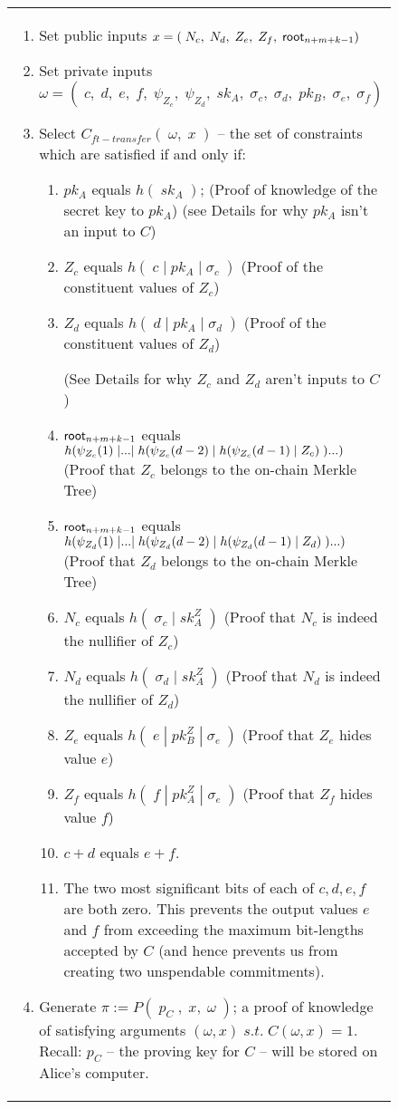 \begin{figure}[htp]
\begin{center}
\begin{framed}
{\begin{tabular}{p{16cm}}
\begin{enumerate}
          \item Set public inputs $x = (\;N_c,\;N_d,\;Z_e,\;Z_f,\;\mathsf{root}_{n+m+k-1})$
          \item Set private inputs $\omega = (\;c,\;d,\;e,\;f,\;\psi_{Z_c},\;\psi_{Z_d},\;sk_A,\;\sigma_c,\;\sigma_d,\;pk_B,\;\sigma_e,\;\sigma_f)$
          \item Select $C_{ft-transfer}(\;\omega,\;x\;)$ -- the set of constraints which are satisfied if and only if:
          \begin{enumerate}
            \item $pk_A$ equals $h(\;sk_A\;)$; (Proof of knowledge of the secret key to $pk_A$) (see Details for why $pk_A$ isn't an input to $C$)
            \item $Z_c$ equals $h(\;c\;|\;pk_A\;|\;\sigma_c\;)$ (Proof of the constituent values of $Z_c$)
            \item $Z_d$ equals $h(\;d\;|\;pk_A\;|\;\sigma_d\;)$ (Proof of the constituent values of $Z_d$)
            
            (See Details for why $Z_c$ and $Z_d$ aren't inputs to $C$)
            \item $\mathsf{root}_{n+m+k-1}$ equals $h\br*{\psi_{Z_c}(1)\;|...|\;h\br*{\psi_{Z_c}(d-2)\;|\;h\br*{\psi_{Z_c}(d-1)\;|\;Z_c}\;}...}$ (Proof that $Z_c$ belongs to the on-chain Merkle Tree)
            \item $\mathsf{root}_{n+m+k-1}$ equals $h\br*{\psi_{Z_d}(1)\;|...|\;h\br*{\psi_{Z_d}(d-2)\;|\;h\br*{\psi_{Z_d}(d-1)\;|\;Z_d}\;}...}$ (Proof that $Z_d$ belongs to the on-chain Merkle Tree)
            \item $N_c$ equals $h(\;\sigma_c\;|\;sk^Z_A\;)$ (Proof that $N_c$ is indeed the nullifier of $Z_c$)
            \item $N_d$ equals $h(\;\sigma_d\;|\;sk^Z_A\;)$ (Proof that $N_d$ is indeed the nullifier of $Z_d$)
            \item $Z_e$ equals $h(\;e\;|\;pk^Z_B\;|\;\sigma_e\;)$ (Proof that $Z_e$ hides value $e$)
            \item $Z_f$ equals $h(\;f\;|\;pk^Z_A\;|\;\sigma_e\;)$ (Proof that $Z_f$ hides value $f$)
            \item $c + d$ equals $e + f$.
            \item The two most significant bits of each of $c, d, e, f$ are both zero. This prevents the output values $e$ and $f$ from exceeding the maximum bit-lengths accepted by $C$ (and hence prevents us from creating two unspendable commitments).
          \end{enumerate}
          \item Generate $\pi := P(\;p_C\;,\;x,\;\omega\;)$; a proof of knowledge of satisfying arguments $(\omega, x)\;s.t.\;C(\omega, x) = 1$. Recall: $p_C$ -- the proving key for $C$ -- will be stored on Alice's computer.
           

\end{enumerate}
\end{tabular}}
\end{framed}
\end{center}
\end{figure}
